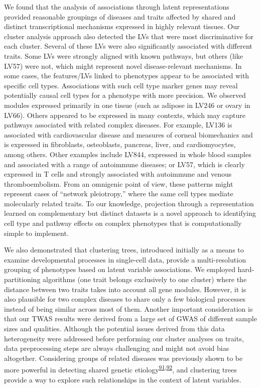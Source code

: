 \documentclass[
  a4paper,
]{article}
\begin{document}
We found that the analysis of associations through latent representations provided reasonable groupings of diseases and traits affected by shared and distinct transcriptional mechanisms expressed in highly relevant tissues.
Our cluster analysis approach also detected the LVs that were most discriminative for each cluster.
Several of these LVs were also significantly associated with different traits.
Some LVs were strongly aligned with known pathways, but others (like LV57) were not, which might represent novel disease-relevant mechanisms.
In some cases, the features/LVs linked to phenotypes appear to be associated with specific cell types.
Associations with such cell type marker genes may reveal potentially causal cell types for a phenotype with more precision.
We observed modules expressed primarily in one tissue (such as adipose in LV246 or ovary in LV66).
Others appeared to be expressed in many contexts, which may capture pathways associated with related complex diseases.
For example, LV136 is associated with cardiovascular disease and measures of corneal biomechanics and is expressed in fibroblasts, osteoblasts, pancreas, liver, and cardiomyocytes, among others.
Other examples include LV844, expressed in whole blood samples and associated with a range of autoimmune diseases;
or LV57, which is clearly expressed in T cells and strongly associated with autoimmune and venous thromboembolism.
From an omnigenic point of view, these patterns might represent cases of ``network pleiotropy,'' where the same cell types mediate molecularly related traits.
To our knowledge, projection through a representation learned on complementary but distinct datasets is a novel approach to identifying cell type and pathway effects on complex phenotypes that is computationally simple to implement.

We also demonstrated that clustering trees, introduced initially as a means to examine developmental processes in single-cell data, provide a multi-resolution grouping of phenotypes based on latent variable associations.
We employed hard-partitioning algorithms (one trait belongs exclusively to one cluster) where the distance between two traits takes into account all gene modules.
However, it is also plausible for two complex diseases to share only a few biological processes instead of being similar across most of them.
Another important consideration is that our TWAS results were derived from a large set of GWAS of different sample sizes and qualities.
Although the potential issues derived from this data heterogeneity were addressed before performing our cluster analyses on traits, data preprocessing steps are always challenging and might not avoid bias altogether.
Considering groups of related diseases was previously shown to be more powerful in detecting shared genetic etiology\textsuperscript{\protect\hyperlink{ref-LyJmyoQr}{91},\protect\hyperlink{ref-veADXImD}{92}}, and clustering trees provide a way to explore such relationships in the context of latent variables.
\end{document}
